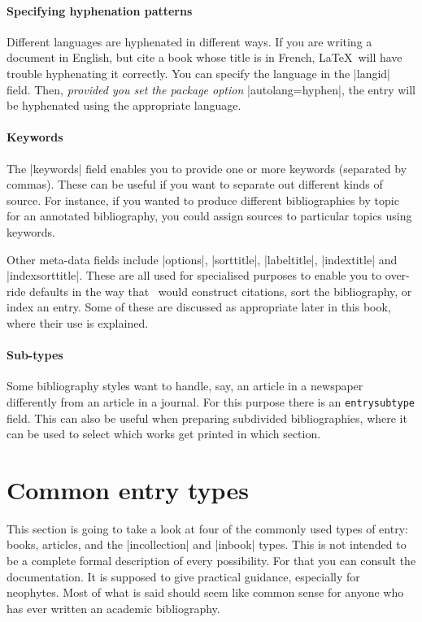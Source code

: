 \paragraph{Specifying hyphenation patterns}Different languages are
hyphenated in different ways.
If you are writing a document in English, but cite a book whose title
is in French, \LaTeX\ will have trouble hyphenating it correctly. You
can specify the language in the |langid| field. Then, \emph{provided
  you set the package option} |autolang=hyphen|, the entry will be
hyphenated using the appropriate language.

\paragraph{Keywords} The |keywords| field enables you to provide one
or more keywords (separated by commas). These can be useful if you
want to separate out different kinds of source. For instance, if you
wanted to produce different bibliographies by topic for an annotated
bibliography, you could assign sources to particular topics using
keywords.

Other meta-data fields include |options|, |sorttitle|, |labeltitle|,
|indextitle| and |indexsorttitle|. These are all used for specialised
purposes to enable you to over-ride defaults in the way that
\biblatex\ would construct citations, sort the bibliography, or index
an entry. Some of these are discussed as appropriate later in this
book, where their use is explained.

\paragraph{Sub-types} Some bibliography styles want to handle, say,
an article in a newspaper differently from an article in a journal. For this
purpose there is an \verb|entrysubtype| field. This can also be useful when
preparing subdivided bibliographies, where it can be used to select which
works get printed in which section.

\section{Common entry types}

This section is going to take a look at four of the commonly used
types of entry: books, articles, and the |incollection| and
|inbook| types. This is not intended to be a complete formal
description of every possibility. For that you can consult the
documentation. It is supposed to give
practical guidance, especially for neophytes. Most of what is said
should seem like common sense for anyone who has ever written an
academic bibliography.

